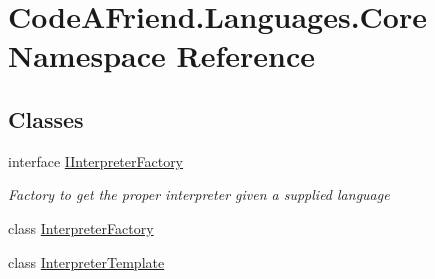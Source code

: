 \hypertarget{namespace_code_a_friend_1_1_languages_1_1_core}{}\section{Code\+A\+Friend.\+Languages.\+Core Namespace Reference}
\label{namespace_code_a_friend_1_1_languages_1_1_core}
\subsection*{Classes}
\begin{DoxyCompactItemize}
\item 
interface \mbox{\hyperlink{interface_code_a_friend_1_1_languages_1_1_core_1_1_i_interpreter_factory}{I\+Interpreter\+Factory}}
\begin{DoxyCompactList}\small\item\em Factory to get the proper interpreter given a supplied language \end{DoxyCompactList}\item 
class \mbox{\hyperlink{class_code_a_friend_1_1_languages_1_1_core_1_1_interpreter_factory}{Interpreter\+Factory}}
\item 
class \mbox{\hyperlink{class_code_a_friend_1_1_languages_1_1_core_1_1_interpreter_template}{Interpreter\+Template}}
\end{DoxyCompactItemize}
